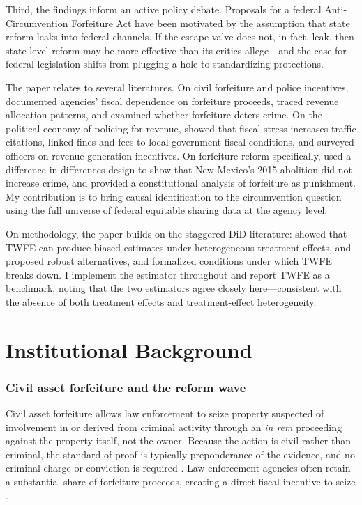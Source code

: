 \documentclass[12pt]{article}
\begin{document}
Third, the findings inform an active policy debate. Proposals for a federal Anti-Circumvention Forfeiture Act have been motivated by the assumption that state reform leaks into federal channels. If the escape valve does not, in fact, leak, then state-level reform may be more effective than its critics allege---and the case for federal legislation shifts from plugging a hole to standardizing protections.

The paper relates to several literatures. On civil forfeiture and police incentives, \citet{worrall2001addicted} documented agencies' fiscal dependence on forfeiture proceeds, \citet{williams2002civil} traced revenue allocation patterns, and \citet{worrall2004effects} examined whether forfeiture deters crime. On the political economy of policing for revenue, \citet{makowsky2009political} showed that fiscal stress increases traffic citations, \citet{sances2017missing} linked fines and fees to local government fiscal conditions, and \citet{garrett2021profits} surveyed officers on revenue-generation incentives. On forfeiture reform specifically, \citet{mcdonald2024does} used a difference-in-differences design to show that New Mexico's 2015 abolition did not increase crime, and \citet{howcrimepays2017} provided a constitutional analysis of forfeiture as punishment. My contribution is to bring causal identification to the circumvention question using the full universe of federal equitable sharing data at the agency level.

On methodology, the paper builds on the staggered DiD literature: \citet{goodmanbacon2021difference} showed that TWFE can produce biased estimates under heterogeneous treatment effects, \citet{callaway2021difference} and \citet{sun2021estimating} proposed robust alternatives, and \citet{dechaisemartin2020two} formalized conditions under which TWFE breaks down. I implement the \citet{callaway2021difference} estimator throughout and report TWFE as a benchmark, noting that the two estimators agree closely here---consistent with the absence of both treatment effects and treatment-effect heterogeneity.


\section{Institutional Background}

\subsubsection*{Civil asset forfeiture and the reform wave} Civil asset forfeiture allows law enforcement to seize property suspected of involvement in or derived from criminal activity through an \textit{in rem} proceeding against the property itself, not the owner. Because the action is civil rather than criminal, the standard of proof is typically preponderance of the evidence, and no criminal charge or conviction is required \citep{howcrimepays2017}. Law enforcement agencies often retain a substantial share of forfeiture proceeds, creating a direct fiscal incentive to seize \citep{worrall2001addicted, garrett2021profits}.
\end{document}
